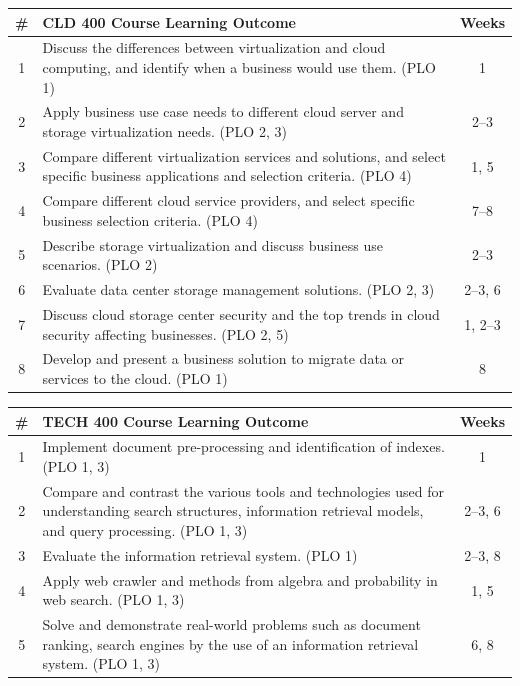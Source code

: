 \documentclass[10pt, a4paper]{article}
\begin{document}
\begin{table}[H]
\centering
\small
\renewcommand{\arraystretch}{1.3}
\begin{tabularx}{\textwidth}{|c|X|c|}
\hline
\rowcolor{lightgray}
\textbf{\#} & \textbf{CLD 400 Course Learning Outcome} & \textbf{Weeks} \\ \hline
1 & Discuss the differences between virtualization and cloud computing, and identify when a business would use them. (PLO 1) & 1 \\ \hline
2 & Apply business use case needs to different cloud server and storage virtualization needs. (PLO 2, 3) & 2--3 \\ \hline
3 & Compare different virtualization services and solutions, and select specific business applications and selection criteria. (PLO 4) & 1, 5 \\ \hline
4 & Compare different cloud service providers, and select specific business selection criteria. (PLO 4) & 7--8 \\ \hline
5 & Describe storage virtualization and discuss business use scenarios. (PLO 2) & 2--3 \\ \hline
6 & Evaluate data center storage management solutions. (PLO 2, 3) & 2--3, 6 \\ \hline
7 & Discuss cloud storage center security and the top trends in cloud security affecting businesses. (PLO 2, 5) & 1, 2--3 \\ \hline
8 & Develop and present a business solution to migrate data or services to the cloud. (PLO 1) & 8 \\ \hline
\end{tabularx}

\vspace{0.6em}

\begin{tabularx}{\textwidth}{|c|X|c|}
\hline
\rowcolor{lightgray}
\textbf{\#} & \textbf{TECH 400 Course Learning Outcome} & \textbf{Weeks} \\ \hline
1 & Implement document pre-processing and identification of indexes. (PLO 1, 3) & 1 \\ \hline
2 & Compare and contrast the various tools and technologies used for understanding search structures, information retrieval models, and query processing. (PLO 1, 3) & 2--3, 6 \\ \hline
3 & Evaluate the information retrieval system. (PLO 1) & 2--3, 8 \\ \hline
4 & Apply web crawler and methods from algebra and probability in web search. (PLO 1, 3) & 1, 5 \\ \hline
5 & Solve and demonstrate real-world problems such as document ranking, search engines by the use of an information retrieval system. (PLO 1, 3) & 6, 8 \\ \hline
\end{tabularx}
\end{table}
\end{document}
